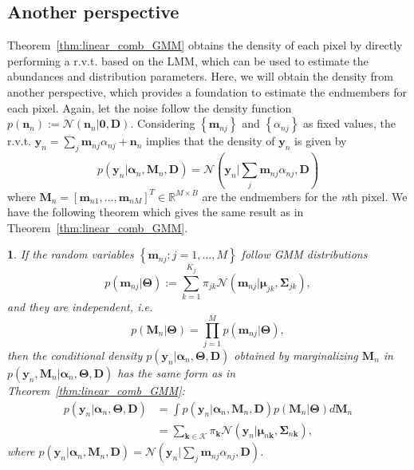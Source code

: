 \documentclass[twocolumn,english]{IEEEtran}
\theoremstyle{plain}
\newtheorem{thm}{\protect\theoremname}
\providecommand{\theoremname}{Theorem}
\begin{document}
\subsection{Another perspective}

Theorem~\ref{thm:linear_comb_GMM} obtains the density of each pixel
by directly performing a r.v.t. based on the LMM, which can be used
to estimate the abundances and distribution parameters. Here, we will
obtain the density from another perspective, which provides a foundation
to estimate the endmembers for each pixel. Again, let the noise follow
the density function $p\left(\mathbf{n}_{n}\right):=\mathcal{N}\left(\mathbf{n}_{n}\vert\mathbf{0},\mathbf{D}\right)$.
Considering $\left\{ \mathbf{m}_{nj}\right\} $ and $\left\{ \alpha_{nj}\right\} $
as fixed values, the r.v.t. $\mathbf{y}_{n}=\sum_{j}\mathbf{m}_{nj}\alpha_{nj}+\mathbf{n}_{n}$
implies that the density of $\mathbf{y}_{n}$ is given by
\begin{equation}
p\left(\mathbf{y}_{n}|\boldsymbol{\alpha}_{n},\mathbf{M}_{n},\mathbf{D}\right)=\mathcal{N}\left(\mathbf{y}_{n}\vert\sum_{j}\mathbf{m}_{nj}\alpha_{nj},\mathbf{D}\right)\label{eq:alternate_density_yn}
\end{equation}
where $\mathbf{M}_{n}=\left[\mathbf{m}_{n1},\dots,\mathbf{m}_{nM}\right]^{T}\in\mathbb{R}^{M\times B}$
are the endmembers for the \emph{n}th pixel. We have the following
theorem which gives the same result as in Theorem~\ref{thm:linear_comb_GMM}. 
\begin{thm}
\label{thm:linear_comb_GMM2}If the random variables $\left\{ \mathbf{m}_{nj}:j=1,\dots,M\right\} $
follow GMM distributions
\[
p\left(\mathbf{m}_{nj}\vert\boldsymbol{\Theta}\right):=\sum_{k=1}^{K_{j}}\pi_{jk}\mathcal{N}\left(\mathbf{m}_{nj}\vert\boldsymbol{\mu}_{jk},\boldsymbol{\Sigma}_{jk}\right),
\]
and they are independent, i.e. 
\begin{equation}
p\left(\mathbf{M}_{n}\vert\boldsymbol{\Theta}\right)=\prod_{j=1}^{M}p\left(\mathbf{m}_{nj}\vert\boldsymbol{\Theta}\right),\label{eq:density_Mn}
\end{equation}
then the conditional density $p\left(\mathbf{y}_{n}\vert\boldsymbol{\alpha}_{n},\boldsymbol{\Theta},\mathbf{D}\right)$
obtained by marginalizing $\mathbf{M}_{n}$ in $p\left(\mathbf{y}_{n},\mathbf{M}_{n}\vert\boldsymbol{\alpha}_{n},\boldsymbol{\Theta},\mathbf{D}\right)$
has the same form as in Theorem~\ref{thm:linear_comb_GMM}:
\begin{align*}
p\left(\mathbf{y}_{n}\vert\boldsymbol{\alpha}_{n},\boldsymbol{\Theta},\mathbf{D}\right) & =\int p\left(\mathbf{y}_{n}\vert\boldsymbol{\alpha}_{n},\mathbf{M}_{n},\mathbf{D}\right)p\left(\mathbf{M}_{n}\vert\boldsymbol{\Theta}\right)d\mathbf{M}_{n}\\
 & =\sum_{\mathbf{k}\in\mathcal{K}}\pi_{\mathbf{k}}\mathcal{N}\left(\mathbf{y}_{n}\vert\boldsymbol{\mu}_{n\mathbf{k}},\boldsymbol{\Sigma}_{n\mathbf{k}}\right),
\end{align*}
where $p\left(\mathbf{y}_{n}|\boldsymbol{\alpha}_{n},\mathbf{M}_{n},\mathbf{D}\right)=\mathcal{N}\left(\mathbf{y}_{n}\vert\sum_{j}\mathbf{m}_{nj}\alpha_{nj},\mathbf{D}\right)$.
\end{thm}
\end{document}
